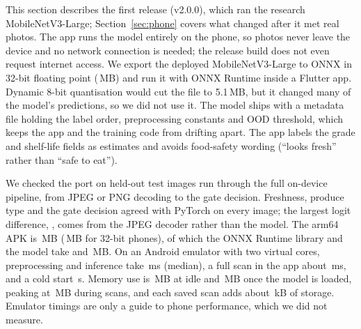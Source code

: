 This section describes the first release (v2.0.0), which ran the research
MobileNetV3-Large; Section~\ref{sec:phone} covers what changed after it met real
photos. The app runs the model entirely on the phone, so photos never leave the device
and no network connection is needed; the release build does not even request
internet access. We export the deployed MobileNetV3-Large to ONNX in 32-bit
floating point (\AppModelMb{}\,MB) and run it with ONNX Runtime inside a Flutter
app. Dynamic 8-bit quantisation would cut the file to 5.1\,MB, but it changed
many of the model's predictions, so we did not use it. The model ships with a
metadata file holding the label order, preprocessing constants and OOD
threshold, which keeps the app and the training code from drifting apart. The
app labels the grade and shelf-life fields as estimates and avoids food-safety
wording (``looks fresh'' rather than ``safe to eat'').

We checked the port on \AppParityN{} held-out test images run through the full
on-device pipeline, from JPEG or PNG decoding to the gate decision. Freshness,
produce type and the gate decision agreed with PyTorch on every image; the
largest logit difference, \AppParityMaxDiff{}, comes from the JPEG decoder rather
than the model. The arm64 APK is \AppApkArm{}\,MB (\AppApkArmSeven{}\,MB for
32-bit phones), of which the ONNX Runtime library and the model take
\AppOrtMb{} and \AppModelMb{}\,MB. On an Android emulator with two virtual
cores, preprocessing and inference take \AppPipeMs{}\,ms (median), a full scan
in the app about \AppScanMs{}\,ms, and a cold start \AppColdMs{}\,s. Memory use
is \AppRamIdle{}\,MB at idle and \AppRamLoaded{}\,MB once the model is loaded,
peaking at \AppRamPeak{}\,MB during scans, and each saved scan adds about
\AppScanKb{}\,kB of storage. Emulator timings are only a guide to phone
performance, which we did not measure.
